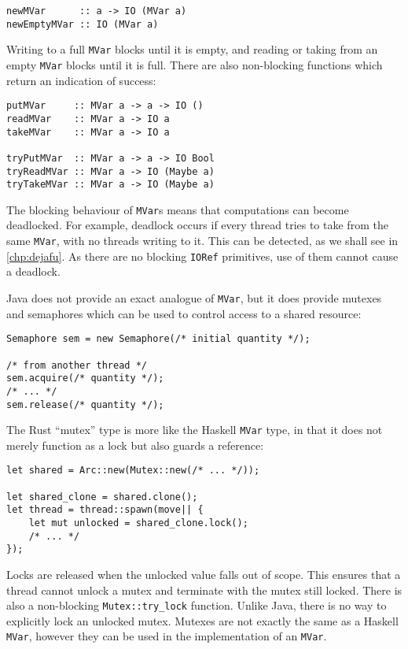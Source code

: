 \begin{verbatim}
newMVar      :: a -> IO (MVar a)
newEmptyMVar :: IO (MVar a)
\end{verbatim}

Writing to a full \verb|MVar| blocks until it is empty, and reading or taking
from an empty \verb|MVar| blocks until it is full.  There are also non-blocking
functions which return an indication of success:

\begin{verbatim}
putMVar     :: MVar a -> a -> IO ()
readMVar    :: MVar a -> IO a
takeMVar    :: MVar a -> IO a

tryPutMVar  :: MVar a -> a -> IO Bool
tryReadMVar :: MVar a -> IO (Maybe a)
tryTakeMVar :: MVar a -> IO (Maybe a)
\end{verbatim}

The blocking behaviour of \verb|MVar|s means that computations can
become deadlocked.  For example, deadlock occurs if every thread tries
to take from the same \verb|MVar|, with no threads writing to it.
This can be detected, as we shall see in \cref{chp:dejafu}.  As there
are no blocking \verb|IORef| primitives, use of them cannot cause a
deadlock.

Java does not provide an exact analogue of \verb|MVar|, but it does
provide mutexes and semaphores which can be used to control access to
a shared resource:

\begin{verbatim}
Semaphore sem = new Semaphore(/* initial quantity */);

/* from another thread */
sem.acquire(/* quantity */);
/* ... */
sem.release(/* quantity */);
\end{verbatim}

The Rust ``mutex'' type is more like the Haskell \verb|MVar| type, in
that it does not merely function as a lock but also guards a
reference:

\begin{verbatim}
let shared = Arc::new(Mutex::new(/* ... */));

let shared_clone = shared.clone();
let thread = thread::spawn(move|| {
    let mut unlocked = shared_clone.lock();
    /* ... */
});
\end{verbatim}

Locks are released when the unlocked value falls out of scope.  This
ensures that a thread cannot unlock a mutex and terminate with the
mutex still locked.  There is also a non-blocking
\verb|Mutex::try_lock| function.  Unlike Java, there is no way to
explicitly lock an unlocked mutex.  Mutexes are not exactly the same
as a Haskell \verb|MVar|, however they can be used in the
implementation of an \verb|MVar|.

